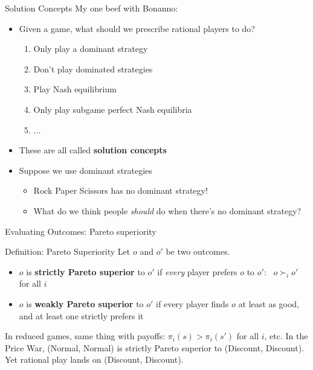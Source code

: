 \begin{frame}{Solution Concepts}
    My one beef with Bonanno:
    \begin{itemize}
        \item Given a game, what should we prescribe rational players to do?
        \begin{enumerate}
            \item Only play a dominant strategy
            \item Don't play dominated strategies
            \item Play Nash equilibrium
            \item Only play subgame perfect Nash equilibria
            \item ...
        \end{enumerate}
        \item These are all called \textbf{solution concepts}
    \end{itemize}
    \bsk
    \begin{itemize}
        \item Suppose we use dominant strategies
        \begin{itemize}
            \item Rock Paper Scissors has no dominant strategy!
            \item What do we think people \textit{should} do when there's no dominant strategy?
        \end{itemize}
    \end{itemize}
\end{frame}

\begin{frame}[standout]
    Evaluating Outcomes: Pareto superiority
\end{frame}

\begin{frame}{Definition: Pareto Superiority}
Let $o$ and $o'$ be two outcomes.
\bsk
\begin{itemize}
    \item $o$ is \textbf{strictly Pareto superior} to $o'$ if \textit{every} player prefers
      $o$ to $o'$: \ $o\succ_i o'$ for all $i$
    \bsk
    \item $o$ is \textbf{weakly Pareto superior} to $o'$ if every player finds $o$ at least
      as good, and at least one strictly prefers it
\end{itemize}
\bsk
In reduced games, same thing with payoffs: $\pi_i(s)>\pi_i(s')$ for all $i$, etc.
\vfill
In the Price War, (Normal, Normal) is strictly Pareto superior to (Discount, Discount).
\bsk
Yet rational play lands on (Discount, Discount).
\vspace{-0.3in}
\end{frame}

